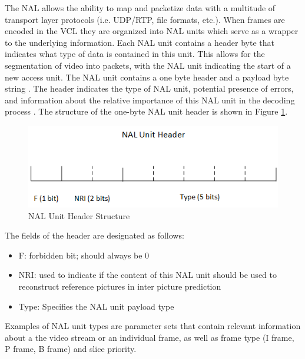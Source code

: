 The NAL allows the ability to map and packetize data with a multitude of transport layer protocols (i.e. UDP/RTP, file formats, etc.). When frames are encoded in the VCL they are organized into NAL units which serve as a wrapper to the underlying information. Each NAL unit contains a header byte that indicates what type of data is contained in this unit. This allows for the segmentation of video into packets, with the NAL unit indicating the start of a new access unit. The NAL unit contains a one byte header and a payload byte string \cite{RTP}. The header indicates the type of NAL unit, potential presence of errors, and information about the relative importance of this NAL unit in the decoding process \cite{RTP}. The structure of the one-byte NAL unit header is shown in Figure \ref{fig:NALHeaderStructure}.
\begin{figure}[H]
\centering
\includegraphics[width=0.55\linewidth]{images/NALUnitHeader.png}
\caption{NAL Unit Header Structure}
\label{fig:NALHeaderStructure}
\end{figure}
The fields of the header are designated as follows:
\begin{itemize}
\item F: forbidden bit; should always be 0
\item NRI: used to indicate if the content of this NAL unit should be used to reconstruct reference pictures in inter picture prediction
\item Type: Specifies the NAL unit payload type
\end{itemize}
Examples of NAL unit types are parameter sets that contain relevant information about a the video stream or an individual frame, as well as frame type (I frame, P frame, B frame) and slice priority. 

